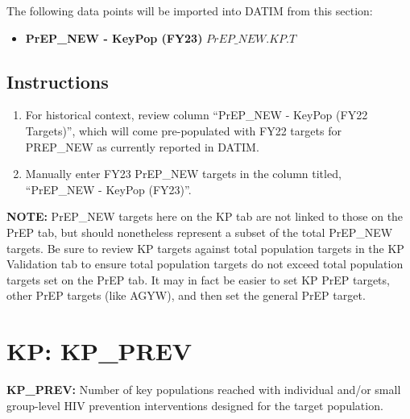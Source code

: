 \documentclass[
  openany]{book}
\providecommand{\tightlist}{%
  \setlength{\itemsep}{0pt}\setlength{\parskip}{0pt}}
\begin{document}
The following data points will be imported into DATIM from this section:

\begin{itemize}
\tightlist
\item
  \textbf{PrEP\_NEW - KeyPop (FY23)} \(PrEP\_NEW.KP.T\)
\end{itemize}

\hypertarget{instructions-34}{%
\subsection{Instructions}\label{instructions-34}}

\begin{enumerate}
\def\labelenumi{\arabic{enumi}.}
\item
  For historical context, review column ``PrEP\_NEW - KeyPop (FY22
  Targets)'', which will come pre-populated with FY22 targets for
  PREP\_NEW as currently reported in DATIM.
\item
  Manually enter FY23 PrEP\_NEW targets in the column titled,
  ``PrEP\_NEW - KeyPop (FY23)''.
\end{enumerate}

\textbf{NOTE:} PrEP\_NEW targets here on the KP tab are not linked to those on
the PrEP tab, but should nonetheless represent a subset of the total
PrEP\_NEW targets. Be sure to review KP targets against total population
targets in the KP Validation tab to ensure total population targets do
not exceed total population targets set on the PrEP tab. It may in fact
be easier to set KP PrEP targets, other PrEP targets (like AGYW), and
then set the general PrEP target.

\hypertarget{kp-kp_prev}{%
\section{KP: KP\_PREV}\label{kp-kp_prev}}

\textbf{KP\_PREV:} Number of key populations reached with individual and/or
small group-level HIV prevention interventions designed for the target
population.
\end{document}
